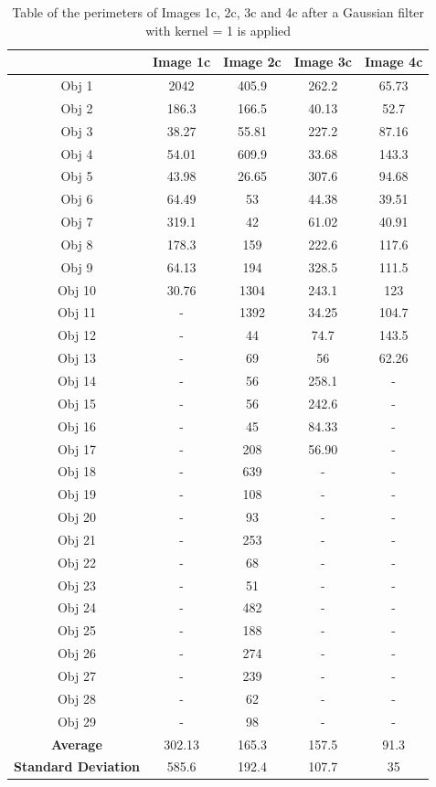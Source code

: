 \documentclass[runningheads]{llncs}
\begin{document}
\begin{table}[h!]
\centering
\begin{tabular}{|c|c|c|c|c|}
\hline
\textbf{} & \textbf{Image 1c} & \textbf{Image 2c} & \textbf{Image 3c} & \textbf{Image 4c} \\
\hline
Obj 1 & 2042     & 405.9 & 262.2 &  65.73 \\ \hline
Obj 2 &  186.3    & 166.5  & 40.13 &  52.7\\ \hline
Obj 3 &  38.27      & 55.81  & 227.2 &  87.16\\ \hline
Obj 4 &  54.01      & 609.9  & 33.68 &  143.3\\ \hline
Obj 5 &  43.98      & 26.65  & 307.6 &  94.68\\ \hline
Obj 6 &  64.49    &  53  & 44.38 &  39.51 \\ \hline
Obj 7 &  319.1    &  42     & 61.02 &  40.91\\ \hline
Obj 8 &   178.3    &   159  & 222.6 &  117.6 \\ \hline
Obj 9 &  64.13     &    194   &   328.5   &  111.5\\ \hline
Obj 10 & 30.76    &     1304  &    243.1  &  123\\ \hline
Obj 11 &   -    &   1392   &     34.25 &  104.7\\ \hline
Obj 12 &  -  &     44  &        74.7  &  143.5\\ \hline
Obj 13 &  -     &  69   &    56 &  62.26\\ \hline
Obj 14 &  -  &     56 &    258.1  & -  \\ \hline
Obj 15 &  -   &    56   &   242.6  &  - \\ \hline
Obj 16 &  -   &    45 &    84.33 &  - \\ \hline
Obj 17 &  -    &   208   &   56.90  &-   \\ \hline
Obj 18 &   -  &    639  &    -  & - \\ \hline
Obj 19 &   -    &    108   &  -    &  -\\ \hline
Obj 20 &  -  &     93  &   -   &  -\\ \hline
Obj 21 &  -     &   253   &  -    & - \\ \hline
Obj 22 &  -  &     68  &   -   & - \\ \hline
Obj 23 &  -  &    51   &   -   & - \\ \hline
Obj 24 &  -  &     482  &   -   & - \\ \hline
Obj 25 &  -     &  188   &  -    & - \\ \hline
Obj 26 &  -  &     274  &  -    & - \\ \hline
Obj 27 &  -   &    239  &  -    & - \\ \hline
Obj 28 &  -   &    62  &   -   &  -\\ \hline
Obj 29 &  -    &    98   &  -    & - \\ \hline
\textbf{Average} &   302.13  &  165.3   & 157.5   & 91.3  \\ \hline
\textbf{Standard Deviation} &  585.6   &  192.4   & 107.7   & 35  \\ \hline
\end{tabular}
\caption{Table of the perimeters of Images 1c, 2c, 3c and 4c after a Gaussian filter with kernel = 1 is applied }
\label{tab:Perimeter-SeriesC-Gaussian1}
\end{table}
\end{document}
